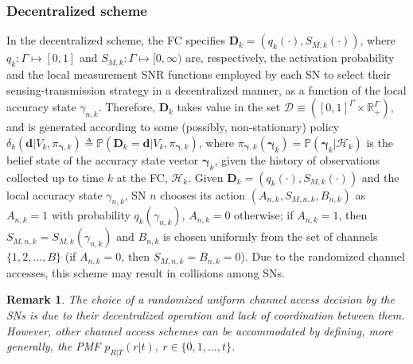\documentclass[10pt,twocolumn,twoside]{IEEEtran}
\theoremstyle{plain}
\newtheorem{remark}{Remark}
\begin{document}
\subsubsection{Decentralized scheme}
 In the decentralized scheme, the FC specifies $\mathbf D_k{=}(q_k(\cdot),S_{M,k}(\cdot))$,
  where $q_k{:}\Gamma{\mapsto}[0,1]$ and $S_{M,k}{:}\Gamma{\mapsto}[0,\infty)$
  are, respectively,
the activation probability and 
the local measurement SNR functions  employed by each SN to select their sensing-transmission strategy in a decentralized manner, as a function of the local accuracy state $\gamma_{n,k}$.
Therefore, $\mathbf D_k$ takes value in the set $\mathcal D\equiv ([0,1]^\Gamma\times\mathbb R_+^\Gamma)$,
and is generated according to some (possibly, non-stationary) policy $\delta_k(\mathbf d|V_k,\pi_{\boldsymbol\gamma,k}){\triangleq}\mathbb P(\mathbf D_{k}{=}\mathbf d|V_k,\pi_{\boldsymbol{\gamma},k})$, where
$\pi_{\boldsymbol\gamma,k}(\boldsymbol\gamma_k)=\mathbb P(\boldsymbol\gamma_k|\mathcal H_k)$
is the belief state of the accuracy state vector $\boldsymbol\gamma_k$, given the history of observations collected up to time $k$ at the FC, $\mathcal H_k$. 
Given 
$\mathbf D_k{=}(q_k(\cdot),S_{M,k}(\cdot))$
and the local accuracy state $\gamma_{n,k}$,
 SN $n$ chooses its action $(A_{n,k},S_{M,n,k},B_{n,k})$
as $A_{n,k}{=}1$ with probability $q_k(\gamma_{n,k})$,
$A_{n,k}{=}0$ otherwise; if $A_{n,k}{=}1$, then
$S_{M,n,k}{=}S_{M,k}(\gamma_{n,k})$ and $B_{n,k}$ is chosen uniformly from the set of  channels $\{1,2,\dots, B\}$
{(if $A_{n,k}{=}0$, then $S_{M,n,k}{=}B_{n,k}{=}0$).}
Due to the randomized channel accesses, this scheme may result in collisions among SNs.
\vspace{-3mm}
\begin{remark}
\label{PMF}
The choice of a randomized uniform channel access decision by the SNs is due to their decentralized operation and 
lack of coordination between them. However, other channel access schemes can be accommodated by defining, more generally, the PMF $p_{R|T}(r|t),\ r\in\{0,1,\dots,t\}$.
\end{remark}
\end{document}
